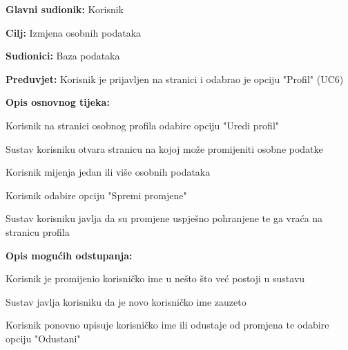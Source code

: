 					\noindent {}
					\begin{packed_item}
	\item \textbf{Glavni sudionik:} Korisnik
	\item  \textbf{Cilj:} Izmjena osobnih podataka
	\item  \textbf{Sudionici:} Baza podataka
	\item  \textbf{Preduvjet:} Korisnik je prijavljen na stranici i odabrao je opciju "Profil" (UC6)
	\item  \textbf{Opis osnovnog tijeka:}
	
	\item[] \begin{packed_enum}
		
		\item Korisnik na stranici osobnog profila odabire opciju "Uredi profil"
		\item Sustav korisniku otvara stranicu na kojoj može promijeniti osobne podatke
		\item Korisnik mijenja jedan ili više osobnih podataka
		\item Korisnik odabire opciju "Spremi promjene"
		\item Sustav korisniku javlja da su promjene uspješno pohranjene te ga vraća na stranicu profila
	\end{packed_enum}
	
	\item  \textbf{Opis mogućih odstupanja:}
	
	\item[] \begin{packed_item}
		
		\item[4.a] Korisnik je promijenio korisničko ime u nešto što već postoji u sustavu
		\item[] \begin{packed_enum}
			
			\item Sustav javlja korisniku da je novo korisničko ime zauzeto
			\item Korisnik ponovno upisuje korisničko ime ili odustaje od promjena te odabire opciju "Odustani"
			
		\end{packed_enum}
	\end{packed_item}
\end{packed_item}

